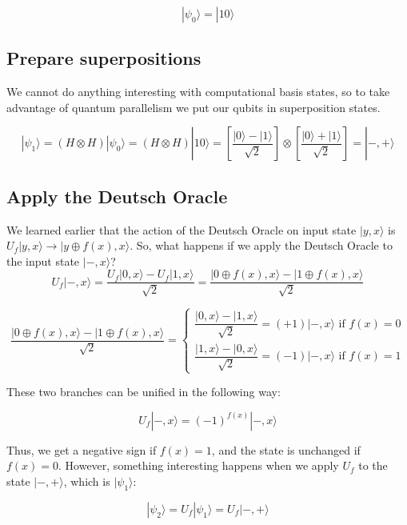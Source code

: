 \documentclass[12pt, letterpaper]{article}
\begin{document}
$$|\psi_0\rangle = |10\rangle$$

\subsection{Prepare superpositions}

We cannot do anything interesting with computational basis states, so to take advantage of quantum parallelism we put our qubits in superposition states.

$$|\psi_1\rangle = (H \otimes H)|\psi_0\rangle = (H \otimes H)|10\rangle = \left[ \dfrac{|0\rangle - |1\rangle}{\sqrt{2}}\right] \otimes \left[ \dfrac{|0\rangle + |1\rangle}{\sqrt{2}}\right] = |-,+\rangle$$

\subsection{Apply the Deutsch Oracle}

We learned earlier that the action of the Deutsch Oracle on input state $|y,x\rangle$ is $U_f|y, x\rangle \rightarrow |y \oplus f(x), x\rangle$. So, what happens if we apply the Deutsch Oracle to the input state $|-,x\rangle$?
\\

$$U_f|-, x\rangle = \dfrac{U_f|0, x\rangle - U_f|1, x\rangle}{\sqrt{2}} =
\dfrac{|0 \oplus f(x), x\rangle - |1 \oplus f(x), x\rangle}{\sqrt{2}}$$

$$\dfrac{|0 \oplus f(x), x\rangle - |1 \oplus f(x), x\rangle}{\sqrt{2}} =
\begin{cases}
   \dfrac{|0, x\rangle - |1, x\rangle}{\sqrt{2}}  = (+1)|-,x\rangle \text{ if } f(x) = 0\\
   \dfrac{|1, x\rangle - |0, x\rangle}{\sqrt{2}}  = (-1)|-,x\rangle \text{ if } f(x) = 1
\end{cases}$$
\vspace{1 mm}

\noindent
These two branches can be unified in the following way:

$$U_f|-, x\rangle = (-1)^{f(x)}|-, x\rangle$$
\vspace{-2 mm}

\noindent
Thus, we get a negative sign if $f(x) = 1$, and the state is unchanged if $f(x) = 0$. However, something interesting happens when we apply $U_f$ to the state $|-,+\rangle$, which is $|\psi_1\rangle$:

$$|\psi_2\rangle = U_f|\psi_1\rangle = U_f|-, +\rangle $$
\vspace{1 mm}
\end{document}
